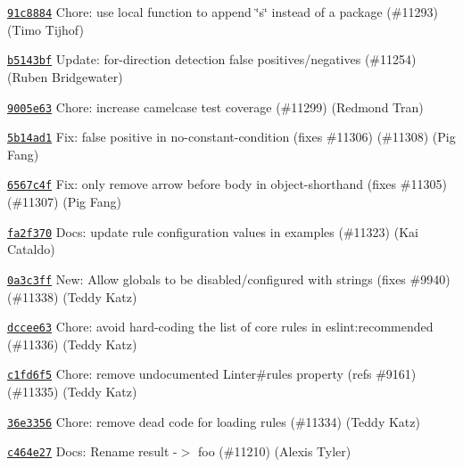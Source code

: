 \begin{DoxyItemize}
\item \href{https://github.com/eslint/eslint/commit/91c8884971f5e57f5f7490d8daf92c4a9a489836}{\texttt{ {\ttfamily 91c8884}}} Chore\+: use local function to append \char`\"{}s\char`\"{} instead of a package (\#11293) (Timo Tijhof)
\item \href{https://github.com/eslint/eslint/commit/b5143bfc09e53d8da8f63421ade093b7593f4f51}{\texttt{ {\ttfamily b5143bf}}} Update\+: for-\/direction detection false positives/negatives (\#11254) (Ruben Bridgewater)
\item \href{https://github.com/eslint/eslint/commit/9005e632d13476880c55f7e3c8a6e450762a5171}{\texttt{ {\ttfamily 9005e63}}} Chore\+: increase camelcase test coverage (\#11299) (Redmond Tran)
\item \href{https://github.com/eslint/eslint/commit/5b14ad1003c7df9a37621dea55c6d6d0484adc05}{\texttt{ {\ttfamily 5b14ad1}}} Fix\+: false positive in no-\/constant-\/condition (fixes \#11306) (\#11308) (Pig Fang)
\item \href{https://github.com/eslint/eslint/commit/6567c4f6665df85c3347388b29d8193cc8208d63}{\texttt{ {\ttfamily 6567c4f}}} Fix\+: only remove arrow before body in object-\/shorthand (fixes \#11305) (\#11307) (Pig Fang)
\item \href{https://github.com/eslint/eslint/commit/fa2f370affa4814dbdda278f9859d0172d4b7aa2}{\texttt{ {\ttfamily fa2f370}}} Docs\+: update rule configuration values in examples (\#11323) (Kai Cataldo)
\item \href{https://github.com/eslint/eslint/commit/0a3c3ff1d91e8f39943efc4a7d2bf6927d68d37e}{\texttt{ {\ttfamily 0a3c3ff}}} New\+: Allow globals to be disabled/configured with strings (fixes \#9940) (\#11338) (Teddy Katz)
\item \href{https://github.com/eslint/eslint/commit/dccee63cf41234180c71bf0fe01b165c9078fc69}{\texttt{ {\ttfamily dccee63}}} Chore\+: avoid hard-\/coding the list of core rules in eslint\+:recommended (\#11336) (Teddy Katz)
\item \href{https://github.com/eslint/eslint/commit/c1fd6f54d92efe615bcae529006221e122dbe9e6}{\texttt{ {\ttfamily c1fd6f5}}} Chore\+: remove undocumented {\ttfamily Linter\#rules} property (refs \#9161) (\#11335) (Teddy Katz)
\item \href{https://github.com/eslint/eslint/commit/36e335681d61cbe3c83b653b7cc5f95730f1d86e}{\texttt{ {\ttfamily 36e3356}}} Chore\+: remove dead code for loading rules (\#11334) (Teddy Katz)
\item \href{https://github.com/eslint/eslint/commit/c464e2744ec76e7e9c6c5af0f6162c92187f1ece}{\texttt{ {\ttfamily c464e27}}} Docs\+: Rename {\ttfamily result} -\/$>$ {\ttfamily foo} (\#11210) (Alexis Tyler)
\end{DoxyItemize}

